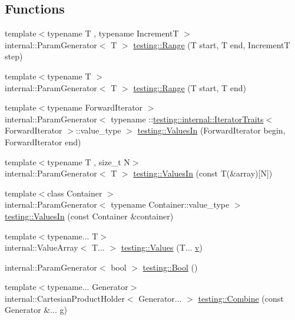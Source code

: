 \subsection*{Functions}
\begin{DoxyCompactItemize}
\item 
{\footnotesize template$<$typename T , typename IncrementT $>$ }\\internal\+::\+Param\+Generator$<$ T $>$ \mbox{\hyperlink{namespacetesting_a4f2c9978ad0c764f57e0cbd6f72cb540}{testing\+::\+Range}} (T start, T end, IncrementT step)
\item 
{\footnotesize template$<$typename T $>$ }\\internal\+::\+Param\+Generator$<$ T $>$ \mbox{\hyperlink{namespacetesting_a9422b51662c54e62609fadcee050595c}{testing\+::\+Range}} (T start, T end)
\item 
{\footnotesize template$<$typename Forward\+Iterator $>$ }\\internal\+::\+Param\+Generator$<$ typename \+::\mbox{\hyperlink{structtesting_1_1internal_1_1_iterator_traits}{testing\+::internal\+::\+Iterator\+Traits}}$<$ Forward\+Iterator $>$\+::value\+\_\+type $>$ \mbox{\hyperlink{namespacetesting_a96240380ae4d3b4855d07de3b84fb336}{testing\+::\+Values\+In}} (Forward\+Iterator begin, Forward\+Iterator end)
\item 
{\footnotesize template$<$typename T , size\+\_\+t N$>$ }\\internal\+::\+Param\+Generator$<$ T $>$ \mbox{\hyperlink{namespacetesting_affa90ba3821bd7ac15f147b1c31f9a73}{testing\+::\+Values\+In}} (const T(\&array)\mbox{[}N\mbox{]})
\item 
{\footnotesize template$<$class Container $>$ }\\internal\+::\+Param\+Generator$<$ typename Container\+::value\+\_\+type $>$ \mbox{\hyperlink{namespacetesting_aa67d0c8470c5f69fcfcacc9e775fa982}{testing\+::\+Values\+In}} (const Container \&container)
\item 
{\footnotesize template$<$typename... T$>$ }\\internal\+::\+Value\+Array$<$ T... $>$ \mbox{\hyperlink{namespacetesting_abd3c87b40c2a0663691c9b617ed5fcc2}{testing\+::\+Values}} (T... \mbox{\hyperlink{_important_values_8h_aaad811047eb9ea3edb6ec2bbeddb2b2b}{v}})
\item 
internal\+::\+Param\+Generator$<$ bool $>$ \mbox{\hyperlink{namespacetesting_a1a0ebe4f77126fb464a8286ce6389bb9}{testing\+::\+Bool}} ()
\item 
{\footnotesize template$<$typename... Generator$>$ }\\internal\+::\+Cartesian\+Product\+Holder$<$ Generator... $>$ \mbox{\hyperlink{namespacetesting_aa79138ff6a7f479fea4fed96a677f083}{testing\+::\+Combine}} (const Generator \&... g)
\end{DoxyCompactItemize}


